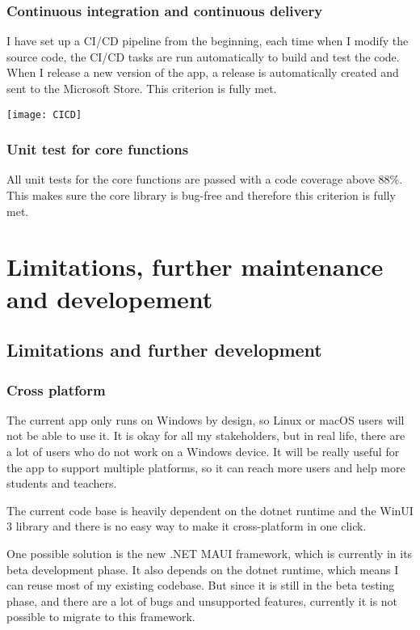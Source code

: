\documentclass[report.tex]{subfiles}
\begin{document}
\subsubsection{Continuous integration and continuous delivery}

I have set up a CI/CD pipeline from the beginning, each time when I modify the source code, the CI/CD tasks are run automatically to build and test the code. When I release a new version of the app, a release is automatically created and sent to the Microsoft Store. This criterion is fully met.

\texttt{[image: CICD]}

\subsubsection{Unit test for core functions}

All unit tests for the core functions are passed with a code coverage above 88\%. This makes sure the core library is bug-free and therefore this criterion is fully met.

\section{Limitations, further maintenance and developement}

\subsection{Limitations and further development}

\subsubsection{Cross platform}

The current app only runs on Windows by design, so Linux or macOS users will not be able to use it. It is okay for all my stakeholders, but in real life, there are a lot of users who do not work on a Windows device. It will be really useful for the app to support multiple platforms, so it can reach more users and help more students and teachers.

The current code base is heavily dependent on the dotnet runtime and the WinUI 3 library and there is no easy way to make it cross-platform in one click.

One possible solution is the new .NET MAUI framework\cite{microsoft:docs:what-is-maui}, which is currently in its beta development phase. It also depends on the dotnet runtime, which means I can reuse most of my existing codebase. But since it is still in the beta testing phase, and there are a lot of bugs and unsupported features, currently it is not possible to migrate to this framework.
\end{document}
